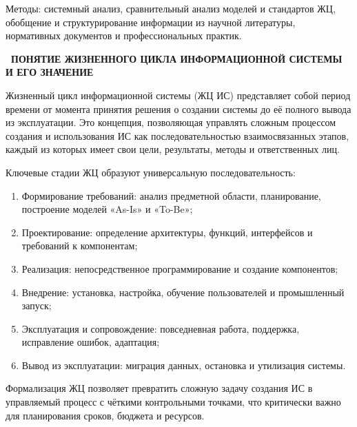\documentclass{SibFU-docs}
\begin{document}
Методы: системный анализ, сравнительный анализ моделей и стандартов ЖЦ, обобщение и структурирование информации из научной литературы, нормативных документов и профессиональных практик.

\newpage
\vspace*{-2.5em}
\begin{center}\textbf{\thesection\ ПОНЯТИЕ ЖИЗНЕННОГО ЦИКЛА ИНФОРМАЦИОННОЙ СИСТЕМЫ И ЕГО ЗНАЧЕНИЕ}\end{center}
\vspace*{-1.5em}

Жизненный цикл информационной системы (ЖЦ ИС) представляет собой период времени от момента принятия решения о создании системы до её полного вывода из эксплуатации. Это концепция, позволяющая управлять сложным процессом создания и использования ИС как последовательностью взаимосвязанных этапов, каждый из которых имеет свои цели, результаты, методы и ответственных лиц.

Ключевые стадии ЖЦ образуют универсальную последовательность:

\begin{enumerate}
\item Формирование требований: анализ предметной области, планирование, построение моделей «As-Is» и «To-Be»;
\item Проектирование: определение архитектуры, функций, интерфейсов и требований к компонентам;
\item Реализация: непосредственное программирование и создание компонентов;
\item Внедрение: установка, настройка, обучение пользователей и промышленный запуск;
\item Эксплуатация и сопровождение: повседневная работа, поддержка, исправление ошибок, адаптация;
\item Вывод из эксплуатации: миграция данных, остановка и утилизация системы.
\end{enumerate}

\vspace{1em}

Формализация ЖЦ позволяет превратить сложную задачу создания ИС в управляемый процесс с чёткими контрольными точками, что критически важно для планирования сроков, бюджета и ресурсов. \cite{gost3460190, ISO12207_2017, Dushin2006}
\end{document}
